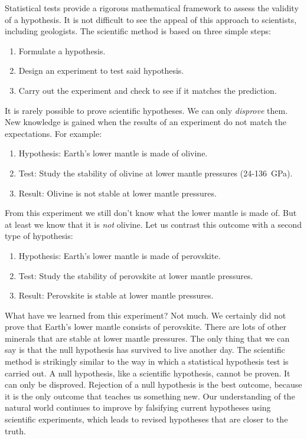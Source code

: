 Statistical tests provide a rigorous mathematical framework to assess
the validity of a hypothesis. It is not difficult to see the appeal of
this approach to scientists, including geologists. The scientific
method is based on three simple steps:

\begin{enumerate}
\item Formulate a hypothesis.
\item Design an experiment to test said hypothesis.
\item Carry out the experiment and check to see if it matches the prediction.
\end{enumerate}

It is rarely possible to prove scientific hypotheses. We can only
\emph{disprove} them. New knowledge is gained when the results of an
experiment do not match the expectations. For example:

\begin{enumerate}
\item Hypothesis: Earth's lower mantle is made of olivine.
\item Test: Study the stability of olivine at lower mantle pressures
  (24-136~GPa).
\item Result: Olivine is not stable at lower mantle pressures.
\end{enumerate}

From this experiment we still don't know what the lower mantle is made
of.  But at least we know that it is \emph{not} olivine. Let us
contrast this outcome with a second type of hypothesis:

\begin{enumerate}
\item Hypothesis: Earth's lower mantle is made of perovskite.
\item Test: Study the stability of perovskite at lower mantle
  pressures.
\item Result: Perovskite is stable at lower mantle pressures.
\end{enumerate}

What have we learned from this experiment? Not much. We certainly did
not prove that Earth's lower mantle consists of perovskite. There are
lots of other minerals that are stable at lower mantle pressures. The
only thing that we can say is that the null hypothesis has survived to
live another day. The scientific method is strikingly similar to the
way in which a statistical hypothesis test is carried out. A null
hypothesis, like a scientific hypothesis, cannot be proven. It can
only be disproved. Rejection of a null hypothesis is the best outcome,
because it is the only outcome that teaches us something new. Our
understanding of the natural world continues to improve by falsifying
current hypotheses using scientific experiments, which leads to
revised hypotheses that are closer to the truth.
\medskip

